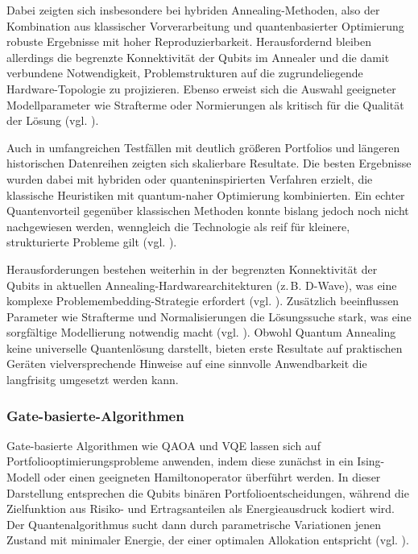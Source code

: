 Dabei zeigten sich insbesondere bei hybriden Annealing-Methoden, also der Kombination aus klassischer Vorverarbeitung und quantenbasierter Optimierung robuste Ergebnisse mit hoher Reproduzierbarkeit. Herausfordernd bleiben allerdings die begrenzte Konnektivität der Qubits im Annealer und die damit verbundene Notwendigkeit, Problemstrukturen auf die zugrundeliegende Hardware-Topologie zu projizieren. Ebenso erweist sich die Auswahl geeigneter Modellparameter wie Strafterme oder Normierungen als kritisch für die Qualität der Lösung (vgl. \cite{sakuler_real-world_2025}).
 
Auch in umfangreichen Testfällen mit deutlich größeren Portfolios und längeren historischen Datenreihen zeigten sich skalierbare Resultate. Die besten Ergebnisse wurden dabei mit hybriden oder quanteninspirierten Verfahren erzielt, die klassische Heuristiken mit quantum-naher Optimierung kombinierten. Ein echter Quantenvorteil gegenüber klassischen Methoden konnte bislang jedoch noch nicht nachgewiesen werden, wenngleich die Technologie als reif für kleinere, strukturierte Probleme gilt (vgl. \cite{bbva_bbva_2020}).

Herausforderungen bestehen weiterhin in der begrenzten Konnektivität der Qubits in aktuellen Annealing-Hardwarearchitekturen (z.\,B. D-Wave), was eine komplexe Problemembedding-Strategie erfordert (vgl. \cite{orus_quantum_2019}). Zusätzlich beeinflussen Parameter wie Strafterme und Normalisierungen die Lösungssuche stark, was eine sorgfältige Modellierung notwendig macht (vgl. \cite{sakuler_real-world_2025}). Obwohl Quantum Annealing keine universelle Quantenlösung darstellt, bieten erste Resultate auf praktischen Geräten vielversprechende Hinweise auf eine sinnvolle Anwendbarkeit die langfrisitg umgesetzt werden kann.

\subsubsection*{Gate-basierte-Algorithmen}
 
Gate-basierte Algorithmen wie QAOA und VQE lassen sich auf Portfoliooptimierungsprobleme anwenden, indem diese zunächst in ein Ising-Modell oder einen geeigneten Hamiltonoperator überführt werden. In dieser Darstellung entsprechen die Qubits binären Portfolioentscheidungen, während die Zielfunktion aus Risiko- und Ertragsanteilen als Energieausdruck kodiert wird. Der Quantenalgorithmus sucht dann durch parametrische Variationen jenen Zustand mit minimaler Energie, der einer optimalen Allokation entspricht (vgl. \cite{buonaiuto_best_2023, brandhofer_benchmarking_2022}).


